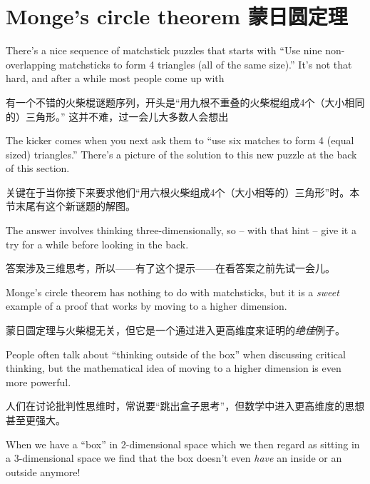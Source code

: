 



\newpage

\section{Monge's circle theorem 蒙日圆定理}
\label{sec:monge}

There's a nice sequence of matchstick puzzles that starts with
``Use nine non-overlapping matchsticks to form 4 triangles (all of
the same size).''  It's not that hard, and after a while most people come
up with 

有一个不错的火柴棍谜题序列，开头是“用九根不重叠的火柴棍组成4个（大小相同的）三角形。” 这并不难，过一会儿大多数人会想出

\begin{center}

\end{center}

The kicker comes when you next ask them to ``use six matches to form
4 (equal sized) triangles.''   There's a picture of the solution to
this new puzzle at the back of this section.

关键在于当你接下来要求他们“用六根火柴组成4个（大小相等的）三角形”时。本节末尾有这个新谜题的解图。

The answer involves 
thinking three-dimensionally, so -- with that hint -- give it a try for a
while before looking in the back.

答案涉及三维思考，所以——有了这个提示——在看答案之前先试一会儿。

Monge's circle theorem has 
nothing to do with matchsticks, but it is a
\emph{sweet} example of a proof that works by moving to a higher dimension.

蒙日圆定理与火柴棍无关，但它是一个通过进入更高维度来证明的\emph{绝佳}例子。

People often talk about ``thinking outside of the box'' when discussing
critical thinking, but the mathematical idea of moving to a higher dimension
is even more powerful.

人们在讨论批判性思维时，常说要“跳出盒子思考”，但数学中进入更高维度的思想甚至更强大。

When we have a ``box'' in 2-dimensional space which
we then regard as sitting in a 3-dimensional space we find that the box
doesn't even \emph{have} an inside or an outside anymore!

